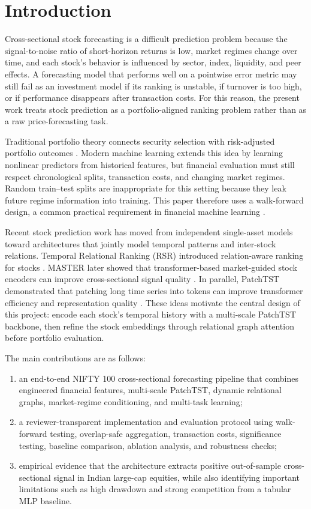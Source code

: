 \documentclass[conference]{IEEEtran}
\begin{document}
\section{Introduction}
Cross-sectional stock forecasting is a difficult prediction problem because the signal-to-noise ratio of short-horizon returns is low, market regimes change over time, and each stock's behavior is influenced by sector, index, liquidity, and peer effects. A forecasting model that performs well on a pointwise error metric may still fail as an investment model if its ranking is unstable, if turnover is too high, or if performance disappears after transaction costs. For this reason, the present work treats stock prediction as a portfolio-aligned ranking problem rather than as a raw price-forecasting task.

Traditional portfolio theory connects security selection with risk-adjusted portfolio outcomes \cite{markowitz1952portfolio,sharpe1966mutual}. Modern machine learning extends this idea by learning nonlinear predictors from historical features, but financial evaluation must still respect chronological splits, transaction costs, and changing market regimes. Random train--test splits are inappropriate for this setting because they leak future regime information into training. This paper therefore uses a walk-forward design, a common practical requirement in financial machine learning \cite{lopezdeprado2018advances}.

Recent stock prediction work has moved from independent single-asset models toward architectures that jointly model temporal patterns and inter-stock relations. Temporal Relational Ranking (RSR) introduced relation-aware ranking for stocks \cite{feng2019temporal}. MASTER later showed that transformer-based market-guided stock encoders can improve cross-sectional signal quality \cite{li2024master}. In parallel, PatchTST demonstrated that patching long time series into tokens can improve transformer efficiency and representation quality \cite{nie2023patchtst}. These ideas motivate the central design of this project: encode each stock's temporal history with a multi-scale PatchTST backbone, then refine the stock embeddings through relational graph attention before portfolio evaluation.

The main contributions are as follows:
\begin{enumerate}
    \item an end-to-end NIFTY 100 cross-sectional forecasting pipeline that combines engineered financial features, multi-scale PatchTST, dynamic relational graphs, market-regime conditioning, and multi-task learning;
    \item a reviewer-transparent implementation and evaluation protocol using walk-forward testing, overlap-safe aggregation, transaction costs, significance testing, baseline comparison, ablation analysis, and robustness checks;
    \item empirical evidence that the architecture extracts positive out-of-sample cross-sectional signal in Indian large-cap equities, while also identifying important limitations such as high drawdown and strong competition from a tabular MLP baseline.
\end{enumerate}
\end{document}
